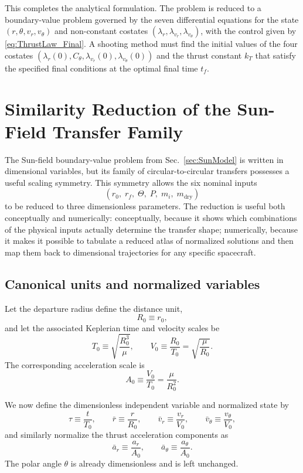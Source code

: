 \documentclass[journal, a4paper]{IEEEtran}
\begin{document}
\medskip
This completes the analytical formulation. The problem is reduced to a boundary-value problem governed by the seven differential equations for the state $(r, \theta, v_r, v_\theta)$ and non-constant costates $(\lambda_r, \lambda_{v_r}, \lambda_{v_\theta})$, with the control given by \eqref{eq:ThrustLaw_Final}. A shooting method must find the initial values of the four costates $(\lambda_r(0), C_\theta, \lambda_{v_r}(0), \lambda_{v_\theta}(0))$ and the thrust constant $k_T$ that satisfy the specified final conditions at the optimal final time $t_f$.

\section{Similarity Reduction of the Sun-Field Transfer Family}
\label{sec:similarity_reduction}

The Sun-field boundary-value problem from Sec.~\ref{sec:SunModel} is written in dimensional variables, but its family of circular-to-circular transfers possesses a useful scaling symmetry. 
This symmetry allows the six nominal inputs
\[
(r_0,\; r_f,\; \Theta,\; P,\; m_i,\; m_\mathrm{dry})
\]
to be reduced to three dimensionless parameters. 
The reduction is useful both conceptually and numerically: conceptually, because it shows which combinations of the physical inputs actually determine the transfer shape; numerically, because it makes it possible to tabulate a reduced atlas of normalized solutions and then map them back to dimensional trajectories for any specific spacecraft.

\subsection{Canonical units and normalized variables}
Let the departure radius define the distance unit,
\begin{equation}
  R_0 \equiv r_0,
\end{equation}
and let the associated Keplerian time and velocity scales be
\begin{equation}
  T_0 \equiv \sqrt{\frac{R_0^3}{\mu}},
  \qquad
  V_0 \equiv \frac{R_0}{T_0} = \sqrt{\frac{\mu}{R_0}}.
\end{equation}
The corresponding acceleration scale is
\begin{equation}
  A_0 \equiv \frac{V_0}{T_0} = \frac{\mu}{R_0^2}.
\end{equation}

We now define the dimensionless independent variable and normalized state by
\begin{equation}
  \tau \equiv \frac{t}{T_0},
  \qquad
  \bar r \equiv \frac{r}{R_0},
  \qquad
  \bar v_r \equiv \frac{v_r}{V_0},
  \qquad
  \bar v_\theta \equiv \frac{v_\theta}{V_0},
\end{equation}
and similarly normalize the thrust acceleration components as
\begin{equation}
  \bar a_r \equiv \frac{a_r}{A_0},
  \qquad
  \bar a_\theta \equiv \frac{a_\theta}{A_0}.
\end{equation}
The polar angle \(\theta\) is already dimensionless and is left unchanged.
\end{document}
